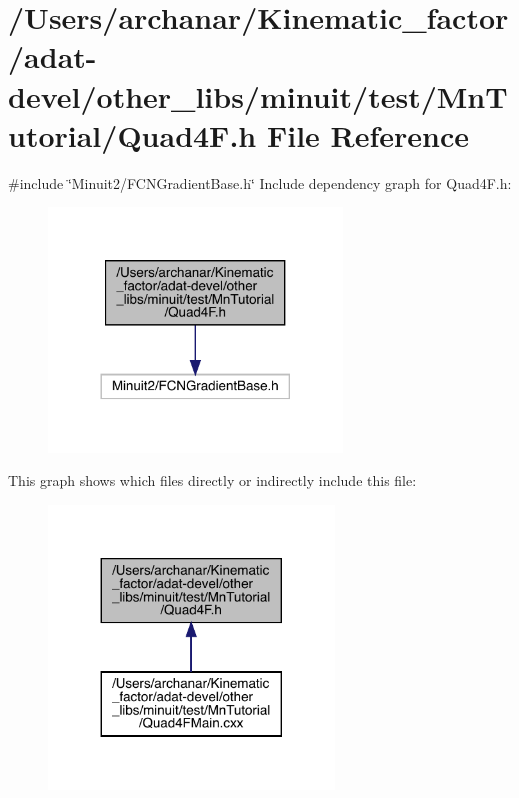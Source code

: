 \hypertarget{adat-devel_2other__libs_2minuit_2test_2MnTutorial_2Quad4F_8h}{}\section{/\+Users/archanar/\+Kinematic\+\_\+factor/adat-\/devel/other\+\_\+libs/minuit/test/\+Mn\+Tutorial/\+Quad4F.h File Reference}
\label{adat-devel_2other__libs_2minuit_2test_2MnTutorial_2Quad4F_8h}
{\ttfamily \#include \char`\"{}Minuit2/\+F\+C\+N\+Gradient\+Base.\+h\char`\"{}}\newline
Include dependency graph for Quad4\+F.\+h\+:
\nopagebreak
\begin{figure}[H]
\begin{center}
\leavevmode
\includegraphics[width=221pt]{d0/d31/adat-devel_2other__libs_2minuit_2test_2MnTutorial_2Quad4F_8h__incl}
\end{center}
\end{figure}
This graph shows which files directly or indirectly include this file\+:
\nopagebreak
\begin{figure}[H]
\begin{center}
\leavevmode
\includegraphics[width=215pt]{d3/d58/adat-devel_2other__libs_2minuit_2test_2MnTutorial_2Quad4F_8h__dep__incl}
\end{center}
\end{figure}
